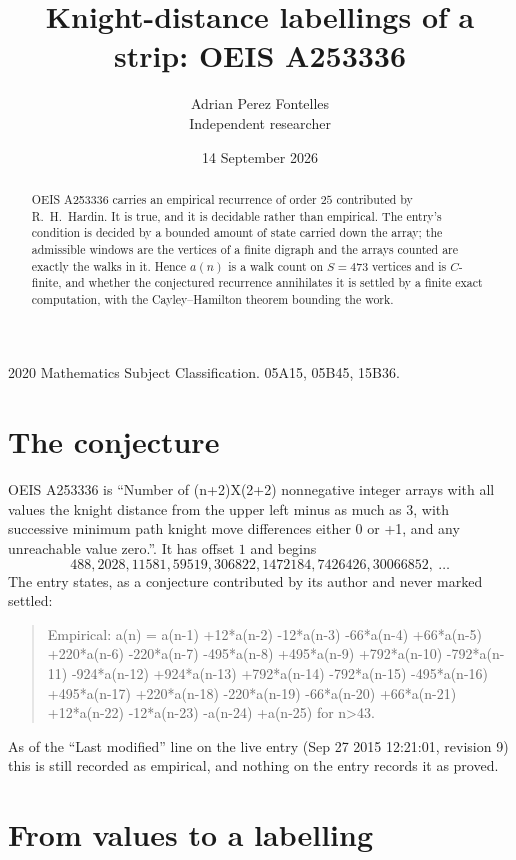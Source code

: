 \documentclass[11pt,a4paper]{article}
\title{Knight-distance labellings of a strip: OEIS A253336}
\author{Adrian Perez Fontelles\\ \small Independent researcher}
\date{14 September 2026}
\theoremstyle{plain}
\theoremstyle{definition}
\begin{document}
\maketitle

\begin{abstract}
OEIS A253336 carries an empirical recurrence of order $25$ contributed by R.~H.~Hardin. It is
true, and it is decidable rather than empirical. The entry's condition is decided by a bounded amount of state carried down the array; the
admissible windows are the vertices of a finite digraph and the arrays counted are exactly the
walks in it. Hence $a(n)$ is a walk count on $S=473$ vertices and is $C$-finite, and whether the
conjectured recurrence annihilates it is settled by a finite exact computation, with the
Cayley--Hamilton theorem bounding the work.
\end{abstract}

\noindent\small 2020 Mathematics Subject Classification. 05A15, 05B45, 15B36.\normalsize

\section{The conjecture}

OEIS A253336 is ``Number of (n+2)X(2+2) nonnegative integer arrays with all values the knight distance from the upper left minus as much as 3, with successive minimum path knight move differences either 0 or +1, and any unreachable value zero.''. It has offset $1$ and begins
\[
488, 2028, 11581, 59519, 306822, 1472184, 7426426, 30066852,\ \dots
\]
The entry states, as a conjecture contributed by its author and never marked settled:
\begin{quote}
Empirical: a(n) = a(n-1) +12*a(n-2) -12*a(n-3) -66*a(n-4) +66*a(n-5) +220*a(n-6) -220*a(n-7) -495*a(n-8) +495*a(n-9) +792*a(n-10) -792*a(n-11) -924*a(n-12) +924*a(n-13) +792*a(n-14) -792*a(n-15) -495*a(n-16) +495*a(n-17) +220*a(n-18) -220*a(n-19) -66*a(n-20) +66*a(n-21) +12*a(n-22) -12*a(n-23) -a(n-24) +a(n-25) for n>43.
\end{quote}
As of the ``Last modified'' line on the live entry (Sep 27 2015 12:21:01, revision 9) this is still
recorded as empirical, and nothing on the entry records it as proved.

\section{From values to a labelling}
\end{document}
